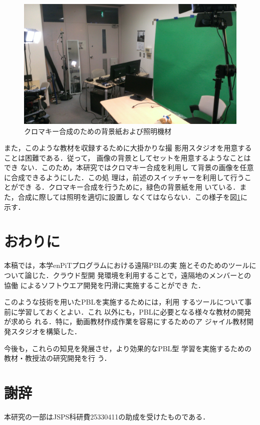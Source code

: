\documentclass[a4j, 12Q, twocolumn, twoside]{jsarticle}
\begin{document}
\begin{figure}
 \centering
 \includegraphics[width=\textwidth]{figures/lights.jpg}
 \caption{クロマキー合成のための背景紙および照明機材}
 \label{fig:lights}
\end{figure}

また，このような教材を収録するために大掛かりな撮
影用スタジオを用意することは困難である．従って，
画像の背景としてセットを用意するようなことはでき
ない．このため，本研究ではクロマキー合成を利用し
て背景の画像を任意に合成できるようにした．この処
理は，前述のスイッチャーを利用して行うことができ
る．クロマキー合成を行うために，緑色の背景紙を用
いている．また，合成に際しては照明を適切に設置し
なくてはならない．この様子を図\ref{fig:lights}に
示す．




\section{おわりに}
本稿では，本学enPiTプログラムにおける遠隔PBLの実
施とそのためのツールについて論じた．クラウド型開
発環境を利用することで，遠隔地のメンバーとの協働
によるソフトウエア開発を円滑に実施することができ
た．

このような技術を用いたPBLを実施するためには，利用
するツールについて事前に学習しておくとよい．これ
以外にも，PBLに必要となる様々な教材の開発が求めら
れる．特に，動画教材作成作業を容易にするためのア
ジャイル教材開発スタジオを構築した．

今後も，これらの知見を発展させ，より効果的なPBL型
学習を実施するための教材・教授法の研究開発を行
う．

\section{謝辞}
本研究の一部はJSPS科研費25330411の助成を受けたものである．



\end{document}
